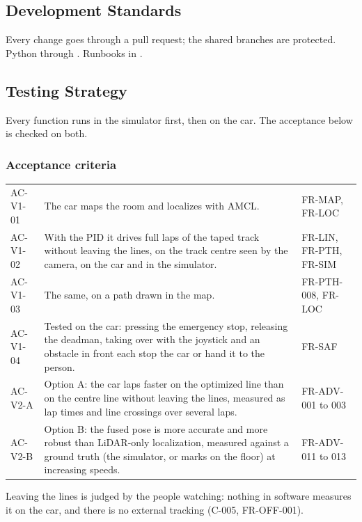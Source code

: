 \documentclass[11pt,a4paper]{article}
\begin{document}
\subsection{Development Standards}
Every change goes through a pull request; the shared branches are protected. Python through . Runbooks in .

\subsection{Testing Strategy}
Every function runs in the simulator first, then on the car. The acceptance below is checked on both.

\subsubsection{Acceptance criteria}
\begin{tabularx}{\textwidth}{@{}L{2.2cm} Y L{2.6cm}@{}}
\toprule
{} &  &  \\
\midrule
\endhead
AC-V1-01 & The car maps the room and localizes with AMCL. & FR-MAP, FR-LOC \\
AC-V1-02 & With the PID it drives full laps of the taped track without leaving the lines, on the track centre seen by the camera, on the car and in the simulator. & FR-LIN, FR-PTH, FR-SIM \\
AC-V1-03 & The same, on a path drawn in the map. & FR-PTH-008, FR-LOC \\
AC-V1-04 & Tested on the car: pressing the emergency stop, releasing the deadman, taking over with the joystick and an obstacle in front each stop the car or hand it to the person. & FR-SAF \\
AC-V2-A & Option A: the car laps faster on the optimized line than on the centre line without leaving the lines, measured as lap times and line crossings over several laps. & FR-ADV-001 to 003 \\
AC-V2-B & Option B: the fused pose is more accurate and more robust than LiDAR-only localization, measured against a ground truth (the simulator, or marks on the floor) at increasing speeds. & FR-ADV-011 to 013 \\
\bottomrule
\end{tabularx}

Leaving the lines is judged by the people watching: nothing in software measures it on the car, and there is no external tracking (C-005, FR-OFF-001).

\end{document}
